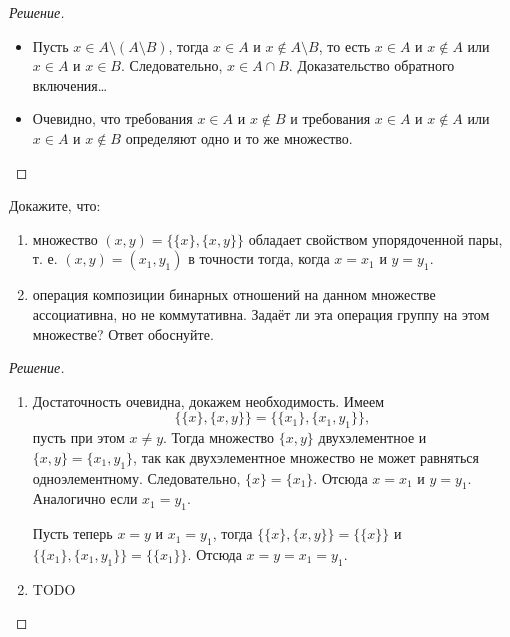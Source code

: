 \begin{proof}[Решение]
\begin{enumerate}[label=(\alph{*})]
\begin{itemize}
                \item Пусть \(x \in A \setminus (A \setminus B)\), тогда \(x \in A\) и \(x \not \in A \setminus B\), то есть \(x \in A\) и \(x \not \in A\) или \(x \in A\) и \(x \in B\). Следовательно, \(x \in A \cap B\). Доказательство обратного включения\ldots
                \item Очевидно, что требования \(x \in A\) и \(x \not \in B\) и требования \(x \in A\) и \(x \not \in A\) или \(x \in A\) и \(x \not \in B\) определяют одно и то же множество.
            \end{itemize}
        \end{enumerate}
    \end{proof}

    \begin{problem}[2]
        Докажите, что:
        \begin{enumerate}[label=(\alph{*})]
            \item множество \((x, y) = \{\{x\}, \{x, y\}\}\) обладает свойством упорядоченной пары, т. е. \((x, y) = (x_1, y_1)\) в точности тогда, когда \(x = x_1\) и \(y = y_1\).
            \item операция композиции бинарных отношений на данном множестве ассоциативна, но не коммутативна. Задаёт ли эта операция группу на этом множестве? Ответ обоснуйте.
        \end{enumerate}
    \end{problem}
    \begin{proof}[Решение]
        \begin{enumerate}[label=(\alph{*})]
            \item Достаточность очевидна, докажем необходимость. Имеем \[
                \{\{x\}, \{x, y\}\} = \{\{x_1\}, \{x_1, y_1\}\},
            \]
            пусть при этом \(x \neq y\). Тогда множество \(\{x, y\}\) двухэлементное и \(\{x, y\} = \{x_1, y_1\}\), так как двухэлементное множество не может равняться одноэлементному. Следовательно, \(\{x\} = \{x_1\}\). Отсюда \(x = x_1\) и \(y = y_1\). Аналогично если \(x_1 = y_1\).

            Пусть теперь \(x = y\) и \(x_1 = y_1\), тогда \(\{\{x\}, \{x, y\}\} = \{\{x\}\}\) и \(\{\{x_1\}, \{x_1, y_1\}\} = \{\{x_1\}\}\). Отсюда \(x = y = x_1 = y_1\).
            \item TODO
        \end{enumerate}
    \end{proof}


